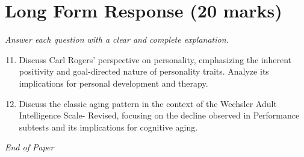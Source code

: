 \documentclass[12pt]{article}
\begin{document}
\section*{Long Form Response (20 marks)}
\textit{Answer each question with a clear and complete explanation.}
\begin{enumerate}[label=\arabic*.]
\setcounter{enumi}{10}
\item Discuss Carl Rogers' perspective on personality, emphasizing the inherent positivity and goal-directed nature of personality traits. Analyze its implications for personal development and therapy.
\item Discuss the classic aging pattern in the context of the Wechsler Adult Intelligence Scale- Revised, focusing on the decline observed in Performance subtests and its implications for cognitive aging.
\end{enumerate}

\vfill
\noindent\textit{End of Paper}
\end{document}
